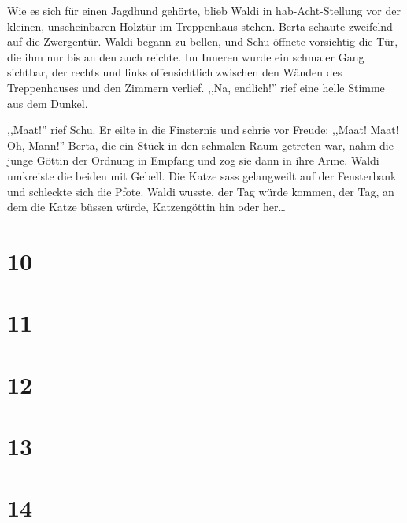 Wie es sich für einen Jagdhund gehörte, blieb Waldi in hab-Acht-Stellung vor der kleinen, unscheinbaren Holztür im Treppenhaus stehen. Berta schaute zweifelnd auf die Zwergentür. Waldi begann zu bellen, und Schu öffnete vorsichtig die Tür, die ihm nur bis an den auch reichte. Im Inneren wurde ein schmaler Gang sichtbar, der rechts und links offensichtlich zwischen den Wänden des Treppenhauses und den Zimmern verlief. ,,Na, endlich!'' rief eine helle Stimme aus dem Dunkel.

,,Maat!'' rief Schu. Er eilte in die Finsternis und schrie vor Freude: ,,Maat! Maat! Oh, Mann!'' Berta, die ein Stück in den schmalen Raum getreten war, nahm die junge Göttin der Ordnung in Empfang und zog sie dann in ihre Arme. Waldi umkreiste die beiden mit Gebell. Die Katze sass gelangweilt auf der Fensterbank und schleckte sich die Pfote. Waldi wusste, der Tag würde kommen, der Tag, an dem die Katze büssen würde, Katzengöttin hin oder her\dots


\section*{10}

\section*{11}

\section*{12}

\section*{13}

\section*{14}




